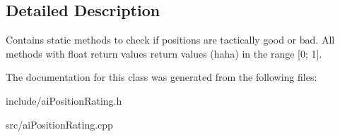 \subsection{\-Detailed \-Description}
\-Contains static methods to check if positions are tactically good or bad. \-All methods with float return values return values (haha) in the range \mbox{[}0; 1\mbox{]}. 

\-The documentation for this class was generated from the following files\-:\begin{DoxyCompactItemize}
\item 
include/ai\-Position\-Rating.\-h\item 
src/ai\-Position\-Rating.\-cpp\end{DoxyCompactItemize}
